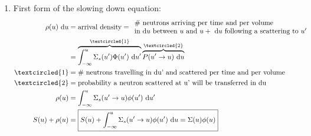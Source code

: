 \documentclass{school-22.211-notes}
\begin{document}
\begin{enumerate}
\item First form of the slowing down equation:
  \begin{align}
    \rho(u) \du 
    &= \mbox{arrival density} = \begin{array}{l}
      \mbox{\# neutrons arriving per time and per volume} \\
      \mbox{in d$u$ between $u$ and $u + \du$ following a scattering to $u'$} 
      \end{array} \\
    &= \overbrace{\int_{-\infty}^u \Sigma_s (u') \Phi(u') \du'}^{\textcircled{1}} \overbrace{ P(u'\to u) \du }^{\textcircled{2}} \\
    \textcircled{1} &= \mbox{\# neutrons travelling in du' and scattered per time and per volume} \\
    \textcircled{2} &= \mbox{probability a neutron scattered at u' will be transferred in du} \\
    \rho(u) &= \int_{-\infty}^u \Sigma_s (u'\to u) \phi(u') \du' \\
    S(u) + \rho(u) &= \boxed{S(u) + \int_{-\infty}^u \Sigma_s (u'\to u) \phi(u') \du  = \Sigma(u) \phi(u) }
  \end{align}
\end{enumerate}
\end{document}
